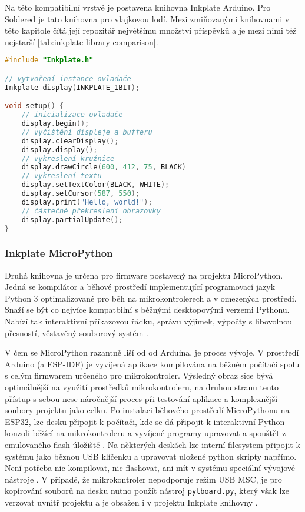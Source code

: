 Na této kompatibilní vrstvě je postavena knihovna Inkplate Arduino. Pro Soldered je tato knihovna pro vlajkovou lodí. Mezi zmiňovanými knihovnami v této kapitole čítá její repozitář největšímu množství příspěvků a je mezi nimi též nejstarší \ref{tab:inkplate-library-comparison}.

\begin{lstlisting}[label=src:arduino-hello-world,language=C++,caption={Ukázka programu pro vykreslení kružnice a Hello World řetězce pomocí Arduino knihovny}]
#include "Inkplate.h"

// vytvoření instance ovladače
Inkplate display(INKPLATE_1BIT);

void setup() {
    // inicializace ovladače
    display.begin();
    // vyčištění displeje a bufferu
    display.clearDisplay();
    display.display();
    // vykreslení kružnice
    display.drawCircle(600, 412, 75, BLACK)
    // vykreslení textu
    display.setTextColor(BLACK, WHITE);
    display.setCursor(587, 550);
    display.print("Hello, world!");
    // částečné překreslení obrazovky
    display.partialUpdate();
}
\end{lstlisting}

\subsubsection{Inkplate MicroPython}
Druhá knihovna je určena pro firmware postavený na projektu MicroPython. Jedná se kompilátor a běhové prostředí implementující programovací jazyk Python 3 optimalizované pro běh na mikrokontrolerech a v omezených prostředí. Snaží se být co nejvíce kompatbilní s běžnými desktopovými verzemi Pythonu. Nabízí tak interaktivní příkazovou řádku, správu výjimek, výpočty s libovolnou přesností, věstavěný souborový systém \cite{MicroPythonPythonMicrocontrollers}.

V čem se MicroPython razantně liší od od Arduina, je proces vývoje. V prostředí Arduino (a ESP-IDF) je vyvíjená aplikace kompilována na běžném počítači spolu s celým firmwarem určeného pro mikrokontroler. Výsledný obraz sice bývá optimálnější na využití prostředků mikrokontroleru, na druhou stranu tento přístup s sebou nese náročnější proces při testování aplikace a komplexnější soubory projektu jako celku. Po instalaci běhového prostředí MicroPythonu na ESP32, lze desku připojit k počítači, kde se dá připojit k interaktivní Python konzoli běžící na mikrokontroleru a vyvíjené programy upravovat a spouštět z emulovaného flash úložiště \cite{MicroPythonPythonMicrocontrollers}. Na některých deskách lze interní filesystem připojit k systému jako běznou USB klíčenku a upravovat uložené python skripty napřímo. Není potřeba nic kompilovat, nic flashovat, ani mít v systému speciální vývojové nástroje \cite{WorkingFilesystemsMicroPython}. V případě, že mikrokontroler nepodporuje režim USB MSC, je pro kopírování souborů na desku nutno použít nástroj \verb|pytboard.py|, který však lze verzovat uvnitř projektu a je obsažen i v projektu Inkplate knihovny \cite{PyboardPyTool}.


